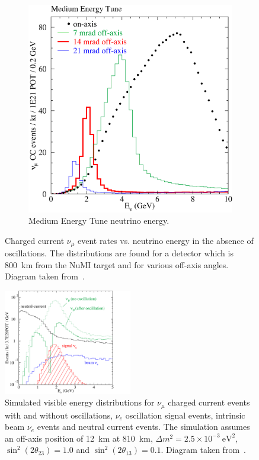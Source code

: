 \begin{figure}
\begin{subfigure}[b]{0.45\textwidth}
    \includegraphics[width=\textwidth]{../../img/baird/beam/050-me-spectra.png}
    \caption{Medium Energy Tune neutrino energy.}
    \label{fig:NuESpectra_MEAndLE_b}
  \end{subfigure}
  \caption{
    Charged current $\nu_{\mu}$ event rates vs. neutrino
    energy in the absence of oscillations. The distributions are found
    for a detector which is 800~km from the NuMI target and for various
    off-axis angles. Diagram taken from~\cite{TDR}.
  }
  \label{fig:NuESpectra_MEAndLE}
\end{figure}


\begin{figure}
  \centering
  \includegraphics[width=0.5\textwidth]{../../img/beam/060-sig-and-bg-rates-thumb.png}
  \caption{Simulated visible energy distributions for $\nu_{\mu}$ charged current
    events with and without oscillations, $\nu_e$ oscillation signal events,
    intrinsic beam $\nu_e$ events and neutral current events. The
    simulation assumes an off-axis position of 12~km at 810~km, $\Delta m^2 = 2.5 \times 10^{-3}
    ~\textrm{eV}^2$, $\sin^2(2\theta_{23}) = 1.0$ and
    $\sin^2(2\theta_{13}) = 0.1$. Diagram taken from~\cite{TDR}.
  }
  \label{fig:NuMIBeamComp}
\end{figure}



